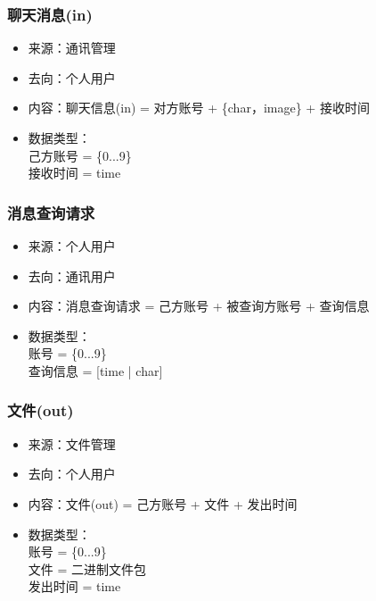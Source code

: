             \subsubsection{聊天消息(in)}
            \begin{itemize}
                \item 来源：通讯管理
                \item 去向：个人用户
                \item 内容：聊天信息(in) = 对方账号 + \{char，image\} + 接收时间
                \item 数据类型：\\
                己方账号 = \{0...9\}\\
                接收时间 = time\\
            \end{itemize}
            \subsubsection{消息查询请求}
            \begin{itemize}
                \item 来源：个人用户
                \item 去向：通讯用户
                \item 内容：消息查询请求 = 己方账号 + 被查询方账号 + 查询信息
                \item 数据类型：\\
                      账号 = \{0...9\}\\
                      查询信息 = [time | {char}]\\
            \end{itemize}
            \subsubsection{文件(out)}
            \begin{itemize}
                \item 来源：文件管理
                \item 去向：个人用户
                \item 内容：文件(out) = 己方账号 + 文件 + 发出时间
                \item 数据类型：\\
                账号 = \{0...9\}\\
                文件 = 二进制文件包\\
                发出时间 = time\\
            \end{itemize}
